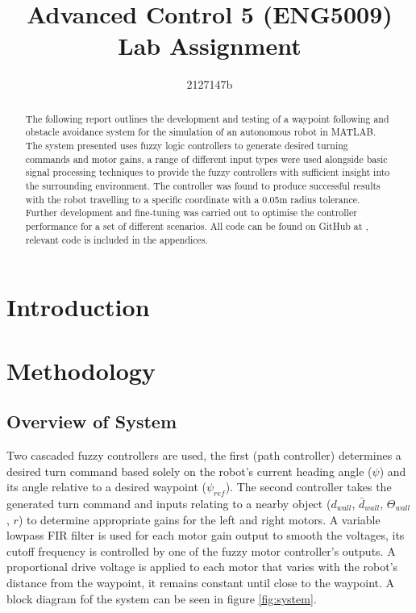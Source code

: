 \documentclass[11pt]{article}
\begin{document}
\title{Advanced Control 5 (ENG5009) \\ \large{Lab Assignment}}
\author{2127147b}
\maketitle

\begin{abstract}
    The following report outlines the development and testing of a waypoint following and obstacle avoidance system for the simulation of an autonomous robot in MATLAB.
    The system presented uses fuzzy logic controllers to generate desired turning commands and motor gains, a range of different input types were used alongside basic signal processing techniques to provide the fuzzy controllers with sufficient insight into the surrounding environment.
    The controller was found to produce successful results with the robot travelling to a specific coordinate with a 0.05m radius tolerance. 
    Further development and fine-tuning was carried out to optimise the controller performance for a set of different scenarios.
    All code can be found on GitHub at \cite{github}, relevant code is included in the appendices.  
    \end{abstract}

\section{Introduction}

\section{Methodology}
\subsection{Overview of System}
Two cascaded fuzzy controllers are used, the first (path controller) determines a desired turn command based solely on the robot's current heading angle ($\psi$) and its angle relative to a desired waypoint ($\psi_{ref}$).
The second controller takes the generated turn command and inputs relating to a nearby object ($d_{wall}$, $\bar{d}_{wall}$, $\Theta_{wall}$, $r$) to determine appropriate gains for the left and right motors.
A variable lowpass FIR filter is used for each motor gain output to smooth the voltages, its cutoff frequency is controlled by one of the fuzzy motor controller's outputs.
A proportional drive voltage is applied to each motor that varies with the robot's distance from the waypoint, it remains constant until close to the waypoint. 
A block diagram fof the system can be seen in figure \ref{fig:system}.
\end{document}
